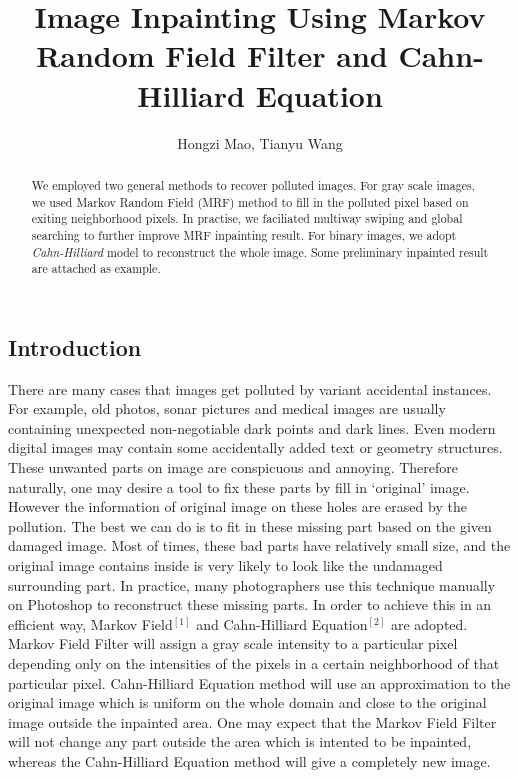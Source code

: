 \documentclass[a4paper]{article}
\title{Image Inpainting Using Markov Random Field Filter and Cahn-Hilliard Equation}
\author{Hongzi Mao, Tianyu Wang}
\begin{document}
\maketitle
\begin{abstract}
\noindent
We employed two general methods to recover polluted images. For gray scale images, we used Markov Random Field (MRF) method to fill in the polluted pixel based on exiting neighborhood pixels. In practise, we faciliated multiway swiping and global searching to further improve MRF inpainting result. For binary images, we adopt \emph{Cahn-Hilliard} model to reconstruct the whole image. Some preliminary inpainted result are attached as example.
\end{abstract}

\begin{spacing}{1.4}
\section{Introduction}
There are many cases that images get polluted by variant accidental instances. For example, old photos, sonar pictures and medical images are usually containing unexpected non-negotiable dark points and dark lines. Even modern digital images may contain some accidentally added text or geometry structures. These unwanted parts on image are conspicuous and annoying. Therefore naturally, one may desire a tool to fix these parts by fill in `original' image. However the information of original image on these holes are erased by the pollution. The best we can do is to fit in these missing part based on the given damaged image. Most of times, these bad parts have relatively small size, and the original image contains inside is very likely to look like the undamaged surrounding part. In practice, many photographers use this technique manually on Photoshop to reconstruct these missing parts. In order to achieve this in an efficient way, Markov Field$^{[1]}$ and Cahn-Hilliard Equation$^{[2]}$ are adopted. Markov Field Filter will assign a gray scale intensity to a particular pixel depending only on the intensities of the pixels in a certain neighborhood of that particular pixel. Cahn-Hilliard Equation method will use an approximation to the original image which is uniform on the whole domain and close to the original image outside the inpainted area. One may expect that the Markov Field Filter will not change any part outside the area which is intented to be inpainted, whereas the Cahn-Hilliard Equation method will give a completely new image.\\

\end{spacing}
\end{document}
